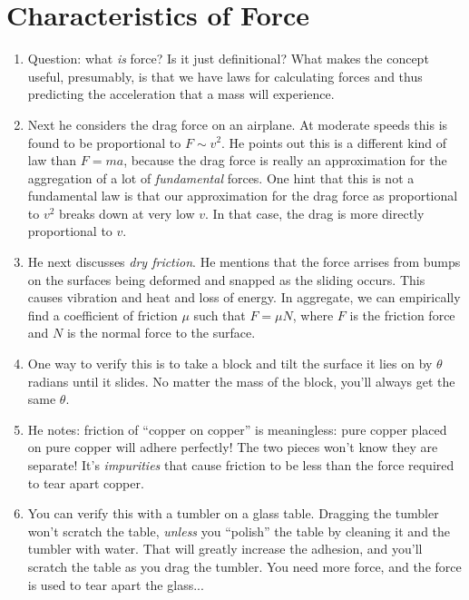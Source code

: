 \section{Characteristics of Force}

\begin{enumerate}

  \item Question: what \emph{is} force? Is it just definitional? What
  makes the concept useful, presumably, is that we have laws for
  calculating forces and thus predicting the acceleration that a mass
  will experience.

  \item Next he considers the drag force on an airplane. At moderate
  speeds this is found to be proportional to $F \sim v^2$. He points out
  this is a different kind of law than $F = ma$, because the drag force
  is really an approximation for the aggregation of a lot of
  \emph{fundamental} forces. One hint that this is not a fundamental law
  is that our approximation for the drag force as proportional to $v^2$
  breaks down at very low $v$. In that case, the drag is more directly
  proportional to $v$.

  \item He next discusses \emph{dry friction}. He mentions that the
  force arrises from bumps on the surfaces being deformed and snapped as
  the sliding occurs. This causes vibration and heat and loss of energy.
  In aggregate, we can empirically find a coefficient of friction $\mu$
  such that $F = \mu N$, where $F$ is the friction force and $N$ is the
  normal force to the surface.

  \item One way to verify this is to take a block and tilt the surface
  it lies on by $\theta$ radians until it slides. No matter the mass of
  the block, you'll always get the same $\theta$.

  \item He notes: friction of ``copper on copper'' is meaningless: pure
  copper placed on pure copper will adhere perfectly! The two pieces
  won't know they are separate! It's \emph{impurities} that cause
  friction to be less than the force required to tear apart copper.

  \item You can verify this with a tumbler on a glass table. Dragging
  the tumbler won't scratch the table, \emph{unless} you ``polish'' the
  table by cleaning it and the tumbler with water. That will greatly
  increase the adhesion, and you'll scratch the table as you drag the
  tumbler. You need more force, and the force is used to tear apart the
  glass...


\end{enumerate}
